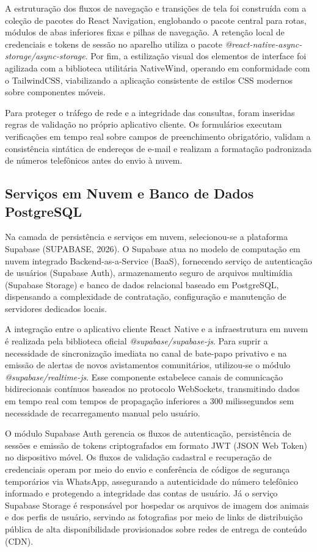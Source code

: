 A estruturação dos fluxos de navegação e transições de tela foi construída com a coleção de pacotes do React Navigation, englobando o pacote central para rotas, módulos de abas inferiores fixas e pilhas de navegação. A retenção local de credenciais e tokens de sessão no aparelho utiliza o pacote \textit{@react-native-async-storage/async-storage}. Por fim, a estilização visual dos elementos de interface foi agilizada com a biblioteca utilitária NativeWind, operando em conformidade com o TailwindCSS, viabilizando a aplicação consistente de estilos CSS modernos sobre componentes móveis.

Para proteger o tráfego de rede e a integridade das consultas, foram inseridas regras de validação no próprio aplicativo cliente. Os formulários executam verificações em tempo real sobre campos de preenchimento obrigatório, validam a consistência sintática de endereços de e-mail e realizam a formatação padronizada de números telefônicos antes do envio à nuvem.

\clearpage

\subsection{Serviços em Nuvem e Banco de Dados PostgreSQL}

Na camada de persistência e serviços em nuvem, selecionou-se a plataforma Supabase (SUPABASE, 2026). O Supabase atua no modelo de computação em nuvem integrado Backend-as-a-Service (BaaS), fornecendo serviço de autenticação de usuários (Supabase Auth), armazenamento seguro de arquivos multimídia (Supabase Storage) e banco de dados relacional baseado em PostgreSQL, dispensando a complexidade de contratação, configuração e manutenção de servidores dedicados locais.

A integração entre o aplicativo cliente React Native e a infraestrutura em nuvem é realizada pela biblioteca oficial \textit{@supabase/supabase-js}. Para suprir a necessidade de sincronização imediata no canal de bate-papo privativo e na emissão de alertas de novos avistamentos comunitários, utilizou-se o módulo \textit{@supabase/realtime-js}. Esse componente estabelece canais de comunicação bidirecionais contínuos baseados no protocolo WebSockets, transmitindo dados em tempo real com tempos de propagação inferiores a 300 milissegundos sem necessidade de recarregamento manual pelo usuário.

O módulo Supabase Auth gerencia os fluxos de autenticação, persistência de sessões e emissão de tokens criptografados em formato JWT (JSON Web Token) no dispositivo móvel. Os fluxos de validação cadastral e recuperação de credenciais operam por meio do envio e conferência de códigos de segurança temporários via WhatsApp, assegurando a autenticidade do número telefônico informado e protegendo a integridade das contas de usuário. Já o serviço Supabase Storage é responsável por hospedar os arquivos de imagem dos animais e dos perfis de usuário, servindo as fotografias por meio de links de distribuição pública de alta disponibilidade provisionados sobre redes de entrega de conteúdo (CDN).

